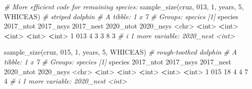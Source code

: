 \documentclass[
]{book}
\newenvironment{Shaded}{\begin{snugshade}}{\end{snugshade}}
\newcommand{\AttributeTok}[1]{\textcolor[rgb]{0.77,0.63,0.00}{#1}}
\newcommand{\CommentTok}[1]{\textcolor[rgb]{0.56,0.35,0.01}{\textit{#1}}}
\newcommand{\DecValTok}[1]{\textcolor[rgb]{0.00,0.00,0.81}{#1}}
\newcommand{\ErrorTok}[1]{\textcolor[rgb]{0.64,0.00,0.00}{\textbf{#1}}}
\newcommand{\FunctionTok}[1]{\textcolor[rgb]{0.00,0.00,0.00}{#1}}
\newcommand{\NormalTok}[1]{#1}
\newcommand{\SpecialCharTok}[1]{\textcolor[rgb]{0.00,0.00,0.00}{#1}}
\newcommand{\StringTok}[1]{\textcolor[rgb]{0.31,0.60,0.02}{#1}}
\begin{document}
\begin{Shaded}
\begin{Highlighting}[]
\CommentTok{\# More efficient code for remaining species: }
\FunctionTok{sample\_size}\NormalTok{(cruz, }\StringTok{\textquotesingle{}013\textquotesingle{}}\NormalTok{, }\DecValTok{1}\NormalTok{, years, }\DecValTok{5}\NormalTok{, }\StringTok{\textquotesingle{}WHICEAS\textquotesingle{}}\NormalTok{) }\CommentTok{\# striped dolphin}
\CommentTok{\# A tibble: 1 x 7}
\CommentTok{\# Groups:   species [1]}
\NormalTok{  species }\StringTok{\textasciigrave{}}\AttributeTok{2017\_ntot}\StringTok{\textasciigrave{}} \StringTok{\textasciigrave{}}\AttributeTok{2017\_nsys}\StringTok{\textasciigrave{}} \StringTok{\textasciigrave{}}\AttributeTok{2017\_nest}\StringTok{\textasciigrave{}} \StringTok{\textasciigrave{}}\AttributeTok{2020\_ntot}\StringTok{\textasciigrave{}} \StringTok{\textasciigrave{}}\AttributeTok{2020\_nsys}\StringTok{\textasciigrave{}}
  \SpecialCharTok{\textless{}}\NormalTok{chr}\SpecialCharTok{\textgreater{}}         \ErrorTok{\textless{}}\NormalTok{int}\SpecialCharTok{\textgreater{}}       \ErrorTok{\textless{}}\NormalTok{int}\SpecialCharTok{\textgreater{}}       \ErrorTok{\textless{}}\NormalTok{int}\SpecialCharTok{\textgreater{}}       \ErrorTok{\textless{}}\NormalTok{int}\SpecialCharTok{\textgreater{}}       \ErrorTok{\textless{}}\NormalTok{int}\SpecialCharTok{\textgreater{}}
\DecValTok{1} \DecValTok{013}               \DecValTok{4}           \DecValTok{3}           \DecValTok{3}           \DecValTok{8}           \DecValTok{3}
\CommentTok{\# i 1 more variable: \textasciigrave{}2020\_nest\textasciigrave{} \textless{}int\textgreater{}}

\FunctionTok{sample\_size}\NormalTok{(cruz, }\StringTok{\textquotesingle{}015\textquotesingle{}}\NormalTok{, }\DecValTok{1}\NormalTok{, years, }\DecValTok{5}\NormalTok{, }\StringTok{\textquotesingle{}WHICEAS\textquotesingle{}}\NormalTok{) }\CommentTok{\# rough{-}toothed dolphin}
\CommentTok{\# A tibble: 1 x 7}
\CommentTok{\# Groups:   species [1]}
\NormalTok{  species }\StringTok{\textasciigrave{}}\AttributeTok{2017\_ntot}\StringTok{\textasciigrave{}} \StringTok{\textasciigrave{}}\AttributeTok{2017\_nsys}\StringTok{\textasciigrave{}} \StringTok{\textasciigrave{}}\AttributeTok{2017\_nest}\StringTok{\textasciigrave{}} \StringTok{\textasciigrave{}}\AttributeTok{2020\_ntot}\StringTok{\textasciigrave{}} \StringTok{\textasciigrave{}}\AttributeTok{2020\_nsys}\StringTok{\textasciigrave{}}
  \SpecialCharTok{\textless{}}\NormalTok{chr}\SpecialCharTok{\textgreater{}}         \ErrorTok{\textless{}}\NormalTok{int}\SpecialCharTok{\textgreater{}}       \ErrorTok{\textless{}}\NormalTok{int}\SpecialCharTok{\textgreater{}}       \ErrorTok{\textless{}}\NormalTok{int}\SpecialCharTok{\textgreater{}}       \ErrorTok{\textless{}}\NormalTok{int}\SpecialCharTok{\textgreater{}}       \ErrorTok{\textless{}}\NormalTok{int}\SpecialCharTok{\textgreater{}}
\DecValTok{1} \DecValTok{015}              \DecValTok{18}           \DecValTok{4}           \DecValTok{4}           \DecValTok{7}           \DecValTok{4}
\CommentTok{\# i 1 more variable: \textasciigrave{}2020\_nest\textasciigrave{} \textless{}int\textgreater{}}


\end{Highlighting}
\end{Shaded}
\end{document}
